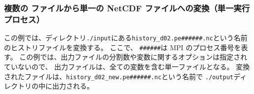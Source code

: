\subsubsection{複数の \scalenetcdf ファイルから単一の NetCDF ファイルへの変換（単一実行プロセス）}
%
%
この例では、ディレクトリ\verb|./input|にある\verb|history_d02.pe######.nc|という名前のヒストリファイルを変換する。
ここで、 \verb|######|は MPI のプロセス番号を表す。
この例では、出力ファイルの分割数や変数に関するオプションは指定されていないので、
出力ファイルは、全ての変数を含む単一ファイルとなる。
変換されたファイルは、\verb|history_d02_new.pe######.nc|という名前で \verb|./output|ディレクトリの中に出力される。


